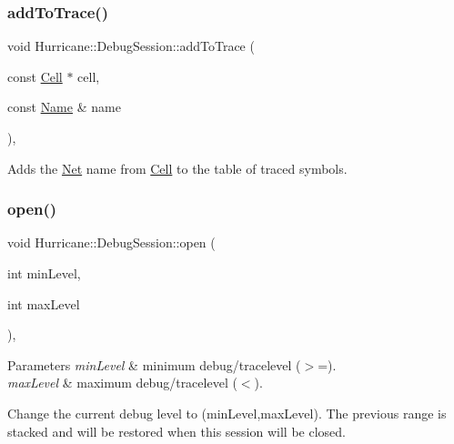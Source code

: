 \subsubsection{\texorpdfstring{add\+To\+Trace()}{addToTrace()}\hspace{0.1cm}{\footnotesize\ttfamily [2/2]}}
{\footnotesize\ttfamily void Hurricane\+::\+Debug\+Session\+::add\+To\+Trace (\begin{DoxyParamCaption}\item[{const \hyperlink{classHurricane_1_1Cell}{Cell} $\ast$}]{cell,  }\item[{const \hyperlink{classHurricane_1_1Name}{Name} \&}]{name }\end{DoxyParamCaption})\hspace{0.3cm}{\ttfamily [inline]}, {\ttfamily [static]}}

Adds the \hyperlink{classHurricane_1_1Net}{Net} {\ttfamily name} from {\ttfamily \hyperlink{classHurricane_1_1Cell}{Cell}} to the table of traced symbols. \mbox{\label{classHurricane_1_1DebugSession_ac12865b68d1acfd85cd48d4d44d9c4fc}} 
\subsubsection{\texorpdfstring{open()}{open()}\hspace{0.1cm}{\footnotesize\ttfamily [1/2]}}
{\footnotesize\ttfamily void Hurricane\+::\+Debug\+Session\+::open (\begin{DoxyParamCaption}\item[{int}]{min\+Level,  }\item[{int}]{max\+Level }\end{DoxyParamCaption})\hspace{0.3cm}{\ttfamily [inline]}, {\ttfamily [static]}}


\begin{DoxyParams}{Parameters}
{\em min\+Level} & minimum debug/tracelevel ($>$=). \\
\hline
{\em max\+Level} & maximum debug/tracelevel ($<$).\\
\hline
\end{DoxyParams}
Change the current debug level to (min\+Level,max\+Level). The previous range is stacked and will be restored when this session will be closed. 

